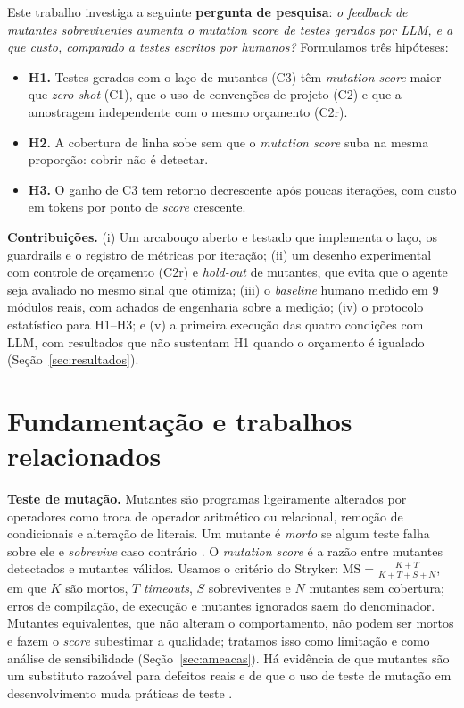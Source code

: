 \documentclass[12pt]{article}
\begin{document}
Este trabalho investiga a seguinte \textbf{pergunta de pesquisa}: \emph{o feedback de mutantes sobreviventes aumenta o
mutation score de testes gerados por LLM, e a que custo, comparado a testes escritos por humanos?} Formulamos três
hipóteses:
\begin{itemize}
  \item \textbf{H1.} Testes gerados com o laço de mutantes (C3) têm \textit{mutation score} maior que \textit{zero-shot}
  (C1), que o uso de convenções de projeto (C2) e que a amostragem independente com o mesmo orçamento (C2r).
  \item \textbf{H2.} A cobertura de linha sobe sem que o \textit{mutation score} suba na mesma proporção: cobrir não é
  detectar.
  \item \textbf{H3.} O ganho de C3 tem retorno decrescente após poucas iterações, com custo em tokens por ponto de
  \textit{score} crescente.
\end{itemize}

\noindent\textbf{Contribuições.} (i) Um arcabouço aberto e testado que implementa o laço, os guardrails e o registro de
métricas por iteração; (ii) um desenho experimental com controle de orçamento (C2r) e \textit{hold-out} de mutantes, que
evita que o agente seja avaliado no mesmo sinal que otimiza; (iii) o \textit{baseline} humano medido em 9 módulos reais,
com achados de engenharia sobre a medição; (iv) o protocolo estatístico para H1--H3; e (v) a primeira execução das
quatro condições com LLM, com resultados que não sustentam H1 quando o orçamento é igualado (Seção~\ref{sec:resultados}).

\section{Fundamentação e trabalhos relacionados}

\textbf{Teste de mutação.} Mutantes são programas ligeiramente alterados por operadores como troca de operador
aritmético ou relacional, remoção de condicionais e alteração de literais. Um mutante é \emph{morto} se algum teste falha
sobre ele e \emph{sobrevive} caso contrário \cite{demillo1978}. O \textit{mutation score} é a razão entre mutantes
detectados e mutantes válidos. Usamos o critério do Stryker: $\text{MS}=\frac{K+T}{K+T+S+N}$, em que $K$ são mortos, $T$
\textit{timeouts}, $S$ sobreviventes e $N$ mutantes sem cobertura; erros de compilação, de execução e mutantes ignorados
saem do denominador. Mutantes equivalentes, que não alteram o comportamento, não podem ser mortos e fazem o \textit{score}
subestimar a qualidade; tratamos isso como limitação e como análise de sensibilidade (Seção~\ref{sec:ameacas}). Há
evidência de que mutantes são um substituto razoável para defeitos reais \cite{just2014} e de que o uso de teste de
mutação em desenvolvimento muda práticas de teste \cite{petrovic2021}.
\end{document}
